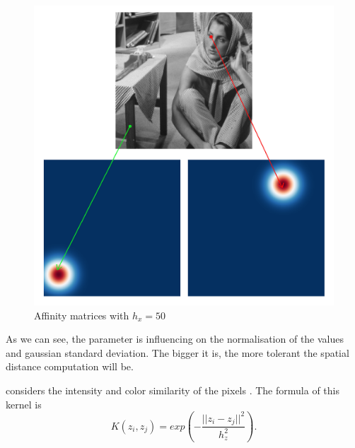 \begin{description}[align=left]
  \begin{figure}[H]
      \centering
      \includegraphics[width=\textwidth]{img/spatialAffinitySigma50.png}
      \caption{Affinity matrices with \(h_x = 50\)}
  \end{figure}

  As we can see, the parameter is influencing on the normalisation of the values and gaussian standard deviation.
  The bigger it is, the more tolerant the spatial distance computation will be.

 \item [Photometric Gaussian Kernel] considers the intensity and color similarity of the pixels \cite{siam_slides_2016}.
  The formula of this kernel is
  \[K(z_i, z_j) = exp(-\frac{||z_i - z_j||^2}{h_z^2}).\]


\end{description}
